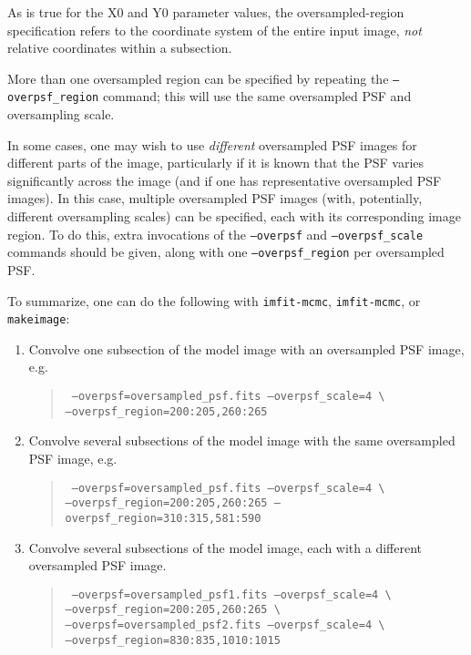 \documentclass[10pt,a4paper,article]{memoir}
\newcommand{\imfitmcmc}{\texttt{imfit-mcmc}}
\newcommand{\makeimage}{\texttt{makeimage}}
\begin{document}
As is true for the X0 and Y0 parameter values, the oversampled-region
specification refers to the coordinate system of the entire input image,
\textit{not} relative coordinates within a subsection.

More than one oversampled region can be specified by repeating the 
\texttt{--overpsf\_region} command; this will use the same oversampled
PSF and oversampling scale.

In some cases, one may wish to use \textit{different} oversampled PSF
images for different parts of the image, particularly if it is known
that the PSF varies significantly across the image (and if one has
representative oversampled PSF images). In this case, multiple
oversampled PSF images (with, potentially, different oversampling
scales) can be specified, each with its corresponding image region. To
do this, extra invocations of the \texttt{--overpsf} and
\texttt{--overpsf\_scale} commands should be given, along with one
\texttt{--overpsf\_region} per oversampled PSF.

To summarize, one can do the following with \imfitmcmc, \imfitmcmc, or \makeimage:
\begin{enumerate}
\item Convolve one subsection of the model image with an oversampled PSF image, e.g.
\begin{quote}
\texttt{ --overpsf=oversampled\_psf.fits --overpsf\_scale=4 \textbackslash \\
		--overpsf\_region=200:205,260:265}
\end{quote}

\item Convolve several subsections of the model image with the same oversampled
PSF image, e.g.
\begin{quote}
\texttt{ --overpsf=oversampled\_psf.fits --overpsf\_scale=4 \textbackslash \\
		--overpsf\_region=200:205,260:265 --overpsf\_region=310:315,581:590}
\end{quote}

\item Convolve several subsections of the model image, each with a different
oversampled PSF image.
\begin{quote}
\texttt{ --overpsf=oversampled\_psf1.fits --overpsf\_scale=4 \textbackslash \\
		--overpsf\_region=200:205,260:265  \textbackslash \\
		--overpsf=oversampled\_psf2.fits --overpsf\_scale=4 \textbackslash \\
		--overpsf\_region=830:835,1010:1015 }
\end{quote}

\end{enumerate}
\end{document}
